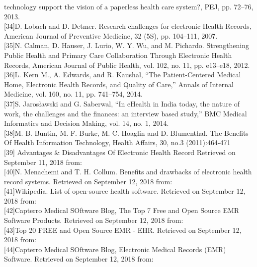 \documentclass[a4paper]{article}
\begin{document}
technology support the vision of a paperless health
care system?, PEJ, pp. 72–76, 2013.\\
[34][34]D. Lobach and D. Detmer. Research challenges for
electronic Health Records, American Journal of
Preventive Medicine, 32 (5S), pp. 104–111, 2007.\\
[35][35]N. Calman, D. Hauser, J. Lurio, W. Y. Wu, and M.
Pichardo. Strengthening Public Health and Primary Care Collaboration Through Electronic Health Records, American Journal of Public Health, vol. 102, no. 11, pp. e13–e18, 2012. \\
[36][36]L. Kern M., A. Edwards, and R. Kaushal, “The
Patient-Centered Medical Home, Electronic Health
Records, and Quality of Care,” Annals of Internal
Medicine, vol. 160, no. 11, pp. 741–754, 2014.\\
[37][37]S. Jarosławski and G. Saberwal, “In eHealth in India
today, the nature of work, the challenges and the
finances: an interview based study,” BMC Medical
Informatics and Decision Making, vol. 14, no. 1,
2014.\\
[38][38]M. B. Buntin, M. F. Burke, M. C. Hoaglin and D. Blumenthal. The Benefits Of Health Information Technology, Health Affairs, 30, no.3 (2011):464-471 \\
[39][39] Advantages & Disadvantages Of Electronic Health Record Retrieved on September 11, 2018 from: \href{https://www.e-spincorp.com/2017/11/23/advantages-disadvantages-of-electronic-health-record/}\\
[40][40]N. Menachemi and T. H. Collum. Benefits and drawbacks of electronic health record systems. Retrieved on September 12, 2018 from: \href{https://www.ncbi.nlm.nih.gov/pmc/articles/PMC3270933/}\\
[41][41]Wikipedia. List of open-source health software.  Retrieved on September 12, 2018 from: \href{https://en.wikipedia.org/wiki/List_of_open-source_health_software/}\\
[42][42]Capterro Medical SOftware Blog, The Top 7 Free and Open Source EMR Software Products. Retrieved on September 12, 2018 from: \href{https://blog.capterra.com/top-7-free-open-source-emr-software-products/}\\
[43][43]Top 20 FREE and Open Source EMR - EHR. Retrieved on September 12, 2018 from: \href{http://medevel.com/top-20-free-and-open-source-emr-ehr/}\\
[44][44]Capterro Medical SOftware Blog, Electronic Medical Records (EMR) Software. Retrieved on September 12, 2018 from: \href{https://www.capterra.com/electronic-medical-records-software/}\\
\end{document}
